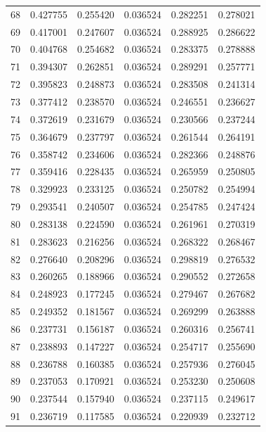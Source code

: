 \documentclass[a4paper, 12pt]{article}
\begin{document}
\begin{tabularx}{\linewidth}{|X|X|X|X|X|X|}
        68 & 0.427755 & 0.255420 & 0.036524 & 0.282251 & 0.278021 \\
        69 & 0.417001 & 0.247607 & 0.036524 & 0.288925 & 0.286622 \\
        70 & 0.404768 & 0.254682 & 0.036524 & 0.283375 & 0.278888 \\
        71 & 0.394307 & 0.262851 & 0.036524 & 0.289291 & 0.257771 \\
        72 & 0.395823 & 0.248873 & 0.036524 & 0.283508 & 0.241314 \\
        73 & 0.377412 & 0.238570 & 0.036524 & 0.246551 & 0.236627 \\
        74 & 0.372619 & 0.231679 & 0.036524 & 0.230566 & 0.237244 \\
        75 & 0.364679 & 0.237797 & 0.036524 & 0.261544 & 0.264191 \\
        76 & 0.358742 & 0.234606 & 0.036524 & 0.282366 & 0.248876 \\
        77 & 0.359416 & 0.228435 & 0.036524 & 0.265959 & 0.250805 \\
        78 & 0.329923 & 0.233125 & 0.036524 & 0.250782 & 0.254994 \\
        79 & 0.293541 & 0.240507 & 0.036524 & 0.254785 & 0.247424 \\
        80 & 0.283138 & 0.224590 & 0.036524 & 0.261961 & 0.270319 \\
        81 & 0.283623 & 0.216256 & 0.036524 & 0.268322 & 0.268467 \\
        82 & 0.276640 & 0.208296 & 0.036524 & 0.298819 & 0.276532 \\
        83 & 0.260265 & 0.188966 & 0.036524 & 0.290552 & 0.272658 \\
        84 & 0.248923 & 0.177245 & 0.036524 & 0.279467 & 0.267682 \\
        85 & 0.249352 & 0.181567 & 0.036524 & 0.269299 & 0.263888 \\
        86 & 0.237731 & 0.156187 & 0.036524 & 0.260316 & 0.256741 \\
        87 & 0.238893 & 0.147227 & 0.036524 & 0.254717 & 0.255690 \\
        88 & 0.236788 & 0.160385 & 0.036524 & 0.257936 & 0.276045 \\
        89 & 0.237053 & 0.170921 & 0.036524 & 0.253230 & 0.250608 \\
        90 & 0.237544 & 0.157940 & 0.036524 & 0.237115 & 0.249617 \\
        91 & 0.236719 & 0.117585 & 0.036524 & 0.220939 & 0.232712 \\

\end{tabularx}
\end{document}
